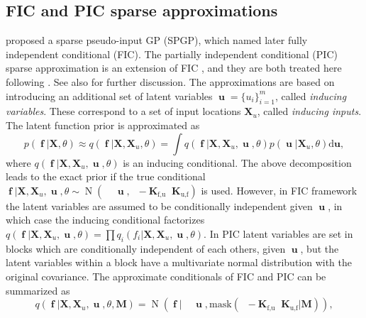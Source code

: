 \documentclass[twoside,11pt]{article}
\DeclareMathOperator{\Kfu}{\mathbf{K}_{f,u}}
\DeclareMathOperator{\Kff}{\mathbf{K}_{f,f}}
\DeclareMathOperator{\iKuu}{\mathbf{K}_{u,u}^{-1}}
\DeclareMathOperator{\f}{\mathbf{f}}
\DeclareMathOperator{\uu}{\mathbf{u}}
\DeclareMathOperator{\N}{N}
\newcommand{\mb}{\mathbf}
\begin{document}
\subsection{FIC and PIC sparse approximations}\label{FIC_PICsparse_approximations}

\citet{Snelson+Ghahramani:2006} proposed a sparse pseudo-input GP
(SPGP), which \citet{Quinonero-Candela+Rasmussen:2005} named later
fully independent conditional (FIC).
The partially independent conditional (PIC) sparse approximation is an
extension of FIC
\citep{Quinonero-Candela+Rasmussen:2005,Snelson+Ghahramani:2007a}, and
they are both treated here following
\citet{Quinonero-Candela+Rasmussen:2005}. See also
\citep{Vanhatalo+Vehtari:2008,Vanhatalo+Pietilainen+Vehtari:2010} for
further discussion. The approximations are based on introducing an
additional set of latent variables $\uu = \{u_i \}_{i=1}^{m}$, called
\emph{inducing variables}. These correspond to a set of input
locations $\mb{X}_{u}$, called \emph{inducing inputs}. The latent
function prior is approximated as
%
\begin{equation}\label{cond_independ_joint_prior}   %
  p(\f|\mb{X}, \theta) \approx q(\f | \mb{X}, \mb{X}_{u}, \theta) = \int q(\f |
  \mb{X}, \mb{X}_{u}, \uu, \theta)p(\uu | \mb{X}_{u}, \theta)\mathrm{d}\mathbf{u},
\end{equation}
%
where $q(\f|\mb{X}, \mb{X}_{u}, \uu, \theta)$ is an inducing
conditional. The above decomposition leads to the exact prior if the
true conditional $\f | \mb{X}, \mb{X}_{u}, \uu, \theta \sim \N(\Kfu \iKuu\uu,
\Kff-\mb{K}_{\text{f,u}} \iKuu \mb{K}_{\text{u,f}})$ is used. However,
in FIC framework the latent variables are assumed to be conditionally
independent given $\uu$, in which case the inducing conditional
factorizes $q(\f | \mb{X}, \mb{X}_{u}, \uu, \theta)\!= \prod q_i(f_i|\mb{X}, \mb{X}_{u}, \uu, \theta)$. In PIC latent
variables are set in blocks which are conditionally independent of
each others, given $\uu$, but the latent variables within a block have
a multivariate normal distribution with the original covariance. The
approximate conditionals of FIC and PIC can be summarized as
%
\begin{equation}
q(\f | \mb{X}, \mb{X}_{u}, \uu, \theta, \mb{M}) = \N(\f|\Kfu \iKuu\uu,
\mathrm{mask}\left(\Kff-\mb{K}_{\text{f,u}} \iKuu
\mb{K}_{\text{u,f}}|\mb{M}\right)), 
\end{equation}
\end{document}
